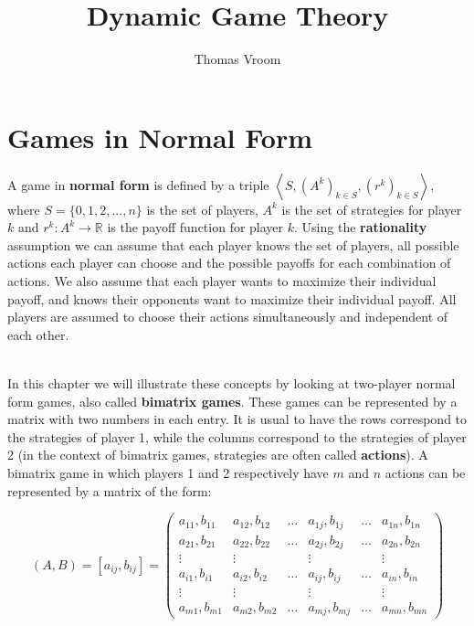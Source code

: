 \documentclass[12pt]{article}
\title{Dynamic Game Theory}
\author{Thomas Vroom}
\begin{document}
\maketitle

\tableofcontents

%
%
\newpage
\section{Games in Normal Form}
A game in \textbf{normal form} is defined by a triple $\left\langle S, \left(A^k\right)_{k \in S}, \left(r^k\right)_{k \in S} \right\rangle$, where $S = \{ 0, 1, 2, ... , n \}$ is the set of players, $A^k$ is the set of strategies for player $k$ and $r^k : A^k \rightarrow \mathbb{R}$ is the payoff function for player $k$.
Using the \textbf{rationality} assumption we can assume that each player knows the set of players, all possible actions each player can choose and the possible payoffs for each combination of actions.
We also assume that each player wants to maximize their individual payoff, and knows their opponents want to maximize their individual payoff.
All players are assumed to choose their actions simultaneously and independent of each other.

\noindent
\\
In this chapter we will illustrate these concepts by looking at two-player normal form games, also called \textbf{bimatrix games}.
These games can be represented by a matrix with two numbers in each entry.
It is usual to have the rows correspond to the strategies of player 1, while the columns correspond to the strategies of player 2 (in the context of bimatrix games, strategies are often called \textbf{actions}).
A bimatrix game in which players 1 and 2 respectively have $m$ and $n$ actions can be represented by a matrix of the form:

\[ (A, B) = [a_{ij}, b_{ij}] = \begin{pmatrix}
    a_{11}, b_{11} & a_{12}, b_{12} & \dots & a_{1j}, b_{1j} & \dots & a_{1n}, b_{1n} \\
    a_{21}, b_{21} & a_{22}, b_{22} & \dots & a_{2j}, b_{2j} & \dots & a_{2n}, b_{2n} \\
    \vdots & \vdots & & \vdots & & \vdots \\
    a_{i1}, b_{i1} & a_{i2}, b_{i2} & \dots & a_{ij}, b_{ij} & \dots & a_{in}, b_{in} \\
    \vdots & \vdots & & \vdots & & \vdots \\
    a_{m1}, b_{m1} & a_{m2}, b_{m2} & \dots & a_{mj}, b_{mj} & \dots & a_{mn}, b_{mn}
\end{pmatrix} \]
\end{document}
